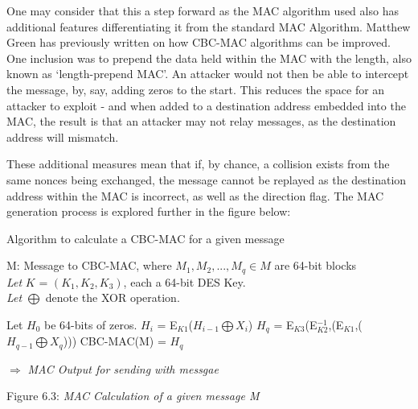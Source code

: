 \documentclass[twoside,11pt,a4paper]{article}
\begin{document}
One may consider that this a step forward as the MAC algorithm used also has additional features differentiating it from the standard MAC Algorithm. Matthew Green \citep{Green13a} has previously written on how CBC-MAC algorithms can be improved. One inclusion was to prepend the data held within the MAC with the length, also known as `length-prepend MAC'. An attacker would not then be able to intercept the message, by, say, adding zeros to the start. This reduces the space for an attacker to exploit - and when added to a destination address embedded into the MAC, the result is that an attacker may not relay messages, as the destination address will mismatch.

These additional measures mean that if, by chance, a collision exists from the same nonces being exchanged, the message cannot be replayed as the destination address within the MAC is incorrect, as well as the direction flag. The MAC generation process is explored further in the figure below:

\begin{algorithm}[H]
\renewcommand{\thealgorithm}{}
\caption{Algorithm to calculate a CBC-MAC for a given message}
M: Message to CBC-MAC, where $M_1,M_2,...,M_q \in M$ are 64-bit blocks\\
\textit{Let} $K$ = $(K_1,K_2,K_3)$, each a 64-bit DES Key.\\
\textit{Let} $\bigoplus$ denote the XOR operation.

\label{MAC Algorithm}
\begin{algorithmic}[1]
\STATE Let $H_0$ be 64-bits of zeros.
	\STATE $H_i$ = E$_{K1}$($H_{i-1} \bigoplus X_i$)
\ENDFOR
\STATE $H_q$ =  E$_{K3}$(E$^{-1}_{K2}$,(E$_{K1}$,($H_{q-1} \bigoplus X_q$)))
\STATE CBC-MAC(M) = $H_q$
\end{algorithmic}
$\Rightarrow$ \textit{MAC Output for sending with messgae}
\end{algorithm}
\begin{center}
\vspace{-0.5cm}
Figure 6.3: \textit{MAC Calculation of a given message M}
\end{center}
\end{document}
